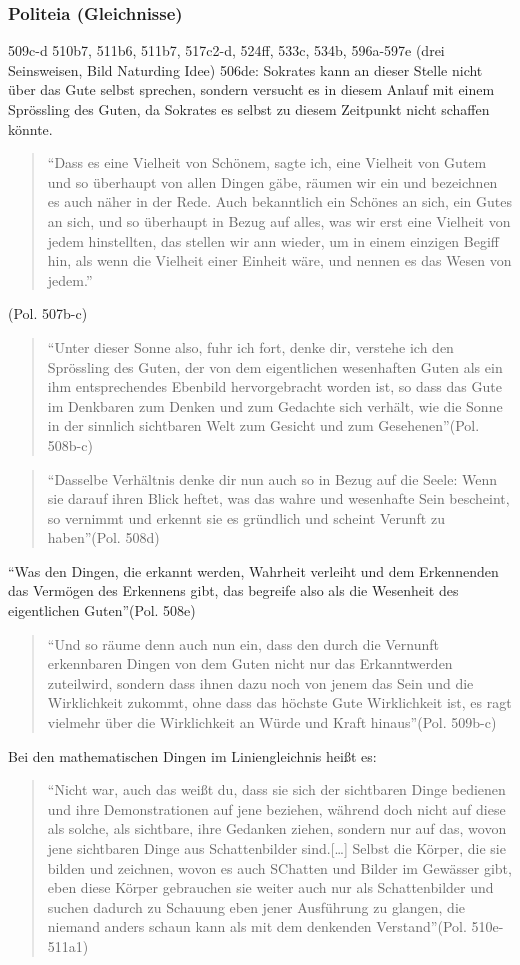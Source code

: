 \documentclass[12pt]{article}
\newcommand*{\zitatblock}[1]{%
    \begin{quote}
    \fontsize{10}{12}\selectfont
    \setlength{\parskip}{1.0em}
    #1
    \end{quote}
}
\begin{document}
\subsubsection{Politeia (Gleichnisse)}
509c-d 510b7, 511b6, 511b7, 517c2-d, 524ff, 533c, 534b, 596a-597e (drei Seinsweisen, Bild Naturding Idee)
506de: Sokrates kann an dieser Stelle nicht über das Gute selbst sprechen, sondern versucht es in diesem Anlauf mit einem Sprössling des Guten, da Sokrates es selbst zu diesem Zeitpunkt nicht schaffen könnte.
\zitatblock{\enquote{Dass es eine Vielheit von Schönem, sagte ich, eine Vielheit von Gutem und so überhaupt von allen Dingen gäbe, räumen wir ein und bezeichnen es auch näher in der Rede. Auch bekanntlich ein Schönes an sich, ein Gutes an sich, und so überhaupt in Bezug auf alles, was wir erst eine Vielheit von jedem hinstellten, das stellen wir ann wieder, um in einem einzigen Begiff hin, als wenn die Vielheit einer Einheit wäre, und nennen es das Wesen von jedem.}} (Pol. 507b-c)
\zitatblock{\enquote{Unter dieser Sonne also, fuhr ich fort, denke dir, verstehe ich den Sprössling des Guten, der von dem eigentlichen wesenhaften Guten als ein ihm entsprechendes Ebenbild hervorgebracht worden ist, so dass das Gute im Denkbaren zum Denken und zum Gedachte sich verhält, wie die Sonne in der sinnlich sichtbaren Welt zum Gesicht und zum Gesehenen}(Pol. 508b-c)}
\zitatblock{\enquote{Dasselbe Verhältnis denke dir nun auch so in Bezug auf die Seele: Wenn sie darauf ihren Blick heftet, was das wahre und wesenhafte Sein bescheint, so vernimmt und erkennt sie es gründlich und scheint Verunft zu haben}(Pol. 508d)}
\enquote{Was den Dingen, die erkannt werden, Wahrheit verleiht und dem Erkennenden das Vermögen des Erkennens gibt, das begreife also als die Wesenheit des eigentlichen Guten}(Pol. 508e)
\zitatblock{\enquote{Und so räume denn auch nun ein, dass den durch die Vernunft erkennbaren Dingen von dem Guten nicht nur das Erkanntwerden zuteilwird, sondern dass ihnen dazu noch von jenem das Sein und die Wirklichkeit zukommt, ohne dass das höchste Gute Wirklichkeit ist, es ragt vielmehr über die Wirklichkeit an Würde und Kraft hinaus}(Pol. 509b-c)}
Bei den mathematischen Dingen im Liniengleichnis heißt es: \zitatblock{\enquote{Nicht war, auch das weißt du, dass sie sich der sichtbaren Dinge bedienen und ihre Demonstrationen auf jene beziehen, während doch nicht auf diese als solche, als sichtbare, ihre Gedanken ziehen, sondern nur auf das, wovon jene sichtbaren Dinge aus Schattenbilder sind.[\dots] Selbst die Körper, die sie bilden und zeichnen, wovon es auch SChatten und Bilder im Gewässer gibt, eben diese Körper gebrauchen sie weiter auch nur als Schattenbilder und suchen dadurch zu Schauung eben jener Ausführung zu glangen, die niemand anders schaun kann als mit dem denkenden Verstand}(Pol. 510e-511a1)}
\end{document}
